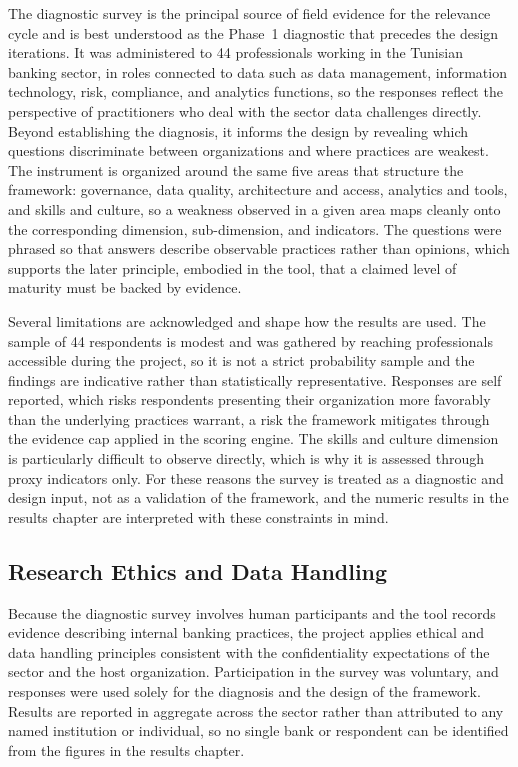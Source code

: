 The diagnostic survey is the principal source of field evidence for the relevance cycle and is best understood as the Phase~1 diagnostic that precedes the design iterations. It was administered to 44 professionals working in the Tunisian banking sector, in roles connected to data such as data management, information technology, risk, compliance, and analytics functions, so the responses reflect the perspective of practitioners who deal with the sector data challenges directly. Beyond establishing the diagnosis, it informs the design by revealing which questions discriminate between organizations and where practices are weakest. The instrument is organized around the same five areas that structure the framework: governance, data quality, architecture and access, analytics and tools, and skills and culture, so a weakness observed in a given area maps cleanly onto the corresponding dimension, sub-dimension, and indicators. The questions were phrased so that answers describe observable practices rather than opinions, which supports the later principle, embodied in the tool, that a claimed level of maturity must be backed by evidence.

Several limitations are acknowledged and shape how the results are used. The sample of 44 respondents is modest and was gathered by reaching professionals accessible during the project, so it is not a strict probability sample and the findings are indicative rather than statistically representative. Responses are self reported, which risks respondents presenting their organization more favorably than the underlying practices warrant, a risk the framework mitigates through the evidence cap applied in the scoring engine. The skills and culture dimension is particularly difficult to observe directly, which is why it is assessed through proxy indicators only. For these reasons the survey is treated as a diagnostic and design input, not as a validation of the framework, and the numeric results in the results chapter are interpreted with these constraints in mind.

\subsection{Research Ethics and Data Handling}

Because the diagnostic survey involves human participants and the tool records evidence describing internal banking practices, the project applies ethical and data handling principles consistent with the confidentiality expectations of the sector and the host organization. Participation in the survey was voluntary, and responses were used solely for the diagnosis and the design of the framework. Results are reported in aggregate across the sector rather than attributed to any named institution or individual, so no single bank or respondent can be identified from the figures in the results chapter.

